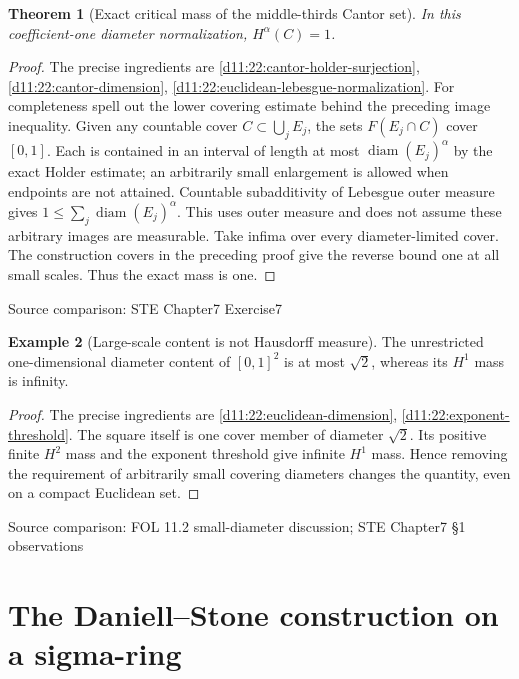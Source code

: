 \documentclass[11pt,oneside,openany]{book}
\newtheorem{theorem}{Theorem}[chapter]
\theoremstyle{definition}
\newtheorem{example}[theorem]{Example}
\theoremstyle{remark}
\DeclareMathOperator{\diam}{diam}\DeclareMathOperator{\dist}{dist}
\newcommand{\family}[1]{}
\newcommand{\source}[1]{\par\begingroup\small\sffamily\color{black!65}Source comparison: #1\par\endgroup}
\begin{document}
\begin{theorem}[Exact critical mass of the middle-thirds Cantor set]\family{D11.22.cantor_exact_mass}\label{d11:22:cantor-exact-mass}
In this coefficient-one diameter normalization, $H^\alpha(C)=1$.
\end{theorem}
\begin{proof}
The precise ingredients are \cref{d11:22:cantor-holder-surjection}, \cref{d11:22:cantor-dimension}, \cref{d11:22:euclidean-lebesgue-normalization}. For completeness spell out the lower covering estimate behind the preceding image inequality. Given any countable cover $C\subset\bigcup_jE_j$, the sets $F(E_j\cap C)$ cover $[0,1]$. Each is contained in an interval of length at most $\diam(E_j)^\alpha$ by the exact Holder estimate; an arbitrarily small enlargement is allowed when endpoints are not attained. Countable subadditivity of Lebesgue outer measure gives $1\le\sum_j\diam(E_j)^\alpha$. This uses outer measure and does not assume these arbitrary images are measurable. Take infima over every diameter-limited cover. The construction covers in the preceding proof give the reverse bound one at all small scales. Thus the exact mass is one.
\end{proof}
\source{STE Chapter7 Exercise7}

\begin{example}[Large-scale content is not Hausdorff measure]\family{D11.22.content_not_measure}\label{d11:22:content-not-measure}
The unrestricted one-dimensional diameter content of $[0,1]^2$ is at most $\sqrt2$, whereas its $H^1$ mass is infinity.
\end{example}
\begin{proof}
The precise ingredients are \cref{d11:22:euclidean-dimension}, \cref{d11:22:exponent-threshold}. The square itself is one cover member of diameter $\sqrt2$. Its positive finite $H^2$ mass and the exponent threshold give infinite $H^1$ mass. Hence removing the requirement of arbitrarily small covering diameters changes the quantity, even on a compact Euclidean set.
\end{proof}
\source{FOL 11.2 small-diameter discussion; STE Chapter7 §1 observations}



\chapter{The Daniell--Stone construction on a sigma-ring}\label{ch:d11-23}
\end{document}

